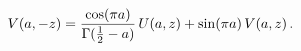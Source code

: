 \[\mathop{V\/}\nolimits\!\left(a,-z\right)=\frac{\mathop{\cos\/}\nolimits(\pi a)%
}{\mathop{\Gamma\/}\nolimits(\frac{1}{2}-a)}\mathop{U\/}\nolimits\!\left(a,z%
\right)+\mathop{\sin\/}\nolimits(\pi a)\mathop{V\/}\nolimits\!\left(a,z\right).\]